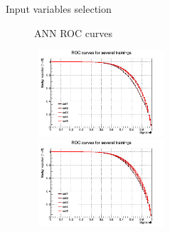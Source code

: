 \documentclass[8pt]{beamer}
\begin{document}
\begin{frame}{Input variables selection}
\begin{figure}[htbp]
\begin{block}{ \centering ANN ROC curves}\end{block}
\begin{minipage}[b]{.48\textwidth}
\begin{center}
\includegraphics[width=5cm, height=3.2cm]{figs/ANN_input_ST.png}
\end{center}
\end{minipage} \hfill
\begin{minipage}[b]{.48\textwidth}
\begin{center}
\includegraphics[width=5cm, height=3.2cm]{figs/ANN_input_TTbar.png}
\end{center}
\end{minipage} \hfill

\label{fig:InputVarROC}
\end{figure}
\end{frame}
\end{document}

